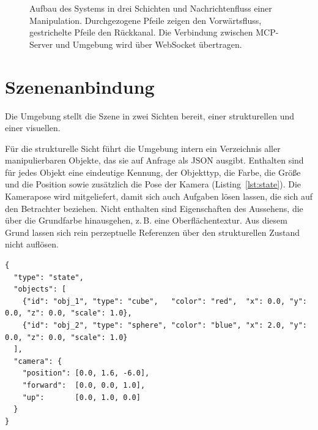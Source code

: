 \begin{figure}[htbp]
{%
  }
  \caption{Aufbau des Systems in drei Schichten und Nachrichtenfluss einer Manipulation. Durchgezogene Pfeile zeigen den Vorwärtsfluss, gestrichelte Pfeile den Rückkanal. Die Verbindung zwischen MCP-Server und Umgebung wird über WebSocket übertragen.}
  \label{fig:architektur}
\end{figure}


\section{Szenenanbindung}
\label{sec:impl-scene}

Die Umgebung stellt die Szene in zwei Sichten bereit, einer strukturellen und einer visuellen.

Für die strukturelle Sicht führt die Umgebung intern ein Verzeichnis aller manipulierbaren Objekte, das sie auf Anfrage als JSON ausgibt.
Enthalten sind für jedes Objekt eine eindeutige Kennung, der Objekttyp, die Farbe, die Größe und die Position sowie zusätzlich die Pose der Kamera (Listing~\ref{lst:state}).
Die Kamerapose wird mitgeliefert, damit sich auch Aufgaben lösen lassen, die sich auf den Betrachter beziehen.
Nicht enthalten sind Eigenschaften des Aussehens, die über die Grundfarbe hinausgehen, z.\,B. eine Oberflächentextur.
Aus diesem Grund lassen sich rein perzeptuelle Referenzen über den strukturellen Zustand nicht auflösen.

\begin{listing}[htbp]
\begin{verbatim}
{
  "type": "state",
  "objects": [
    {"id": "obj_1", "type": "cube",   "color": "red",  "x": 0.0, "y": 0.0, "z": 0.0, "scale": 1.0},
    {"id": "obj_2", "type": "sphere", "color": "blue", "x": 2.0, "y": 0.0, "z": 0.0, "scale": 1.0}
  ],
  "camera": {
    "position": [0.0, 1.6, -6.0],
    "forward":  [0.0, 0.0, 1.0],
    "up":       [0.0, 1.0, 0.0]
  }
}
\end{verbatim}
\caption{Beispiel des strukturellen Szenenzustands als JSON-Ausgabe der Umgebung.}
\label{lst:state}
\end{listing}

